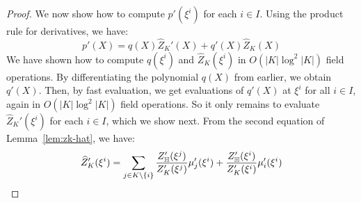 \begin{proof}
    \smallskip
    
     We now show how to compute $p'(\xi^i)$ for each $i\in I$. Using the  product rule for derivatives, we have: \[p'(X)=q(X) \hat{Z}_K'(X)+q'(X) \hat{Z}_K(X)\]
    We have shown how to compute $q(\xi^i)$ and $\hat{Z}_K(\xi^i)$ in $O(|K|\log^2 |K|)$ field operations. By differentiating the polynomial $q(X)$ from earlier, we obtain $q'(X)$. Then, by fast evaluation, we get evaluations of $q'(X)$ at $\xi^i$ for all $i \in I$, again in $O(|K|\log^2 |K|)$ field operations. So it only remains to evaluate $\hat{Z}_K'(\xi^i)$ for each $i\in I$, which we show next.    
%
%    
%
%    
%
	From the second equation of Lemma~\ref{lem:zk-hat}, we have:
    $$  \widehat{Z}_K'(\xi^i) = \sum_{j\in K\setminus \{i\}} \frac{Z_{\mathbb{H}}'(\xi^j)}{Z_K'(\xi^j)}\mu_j'(\xi^i) + \frac{Z_{\mathbb{H}}'(\xi^i)}{Z_K'(\xi^i)}\mu_i'(\xi^i)$$


\end{proof}
